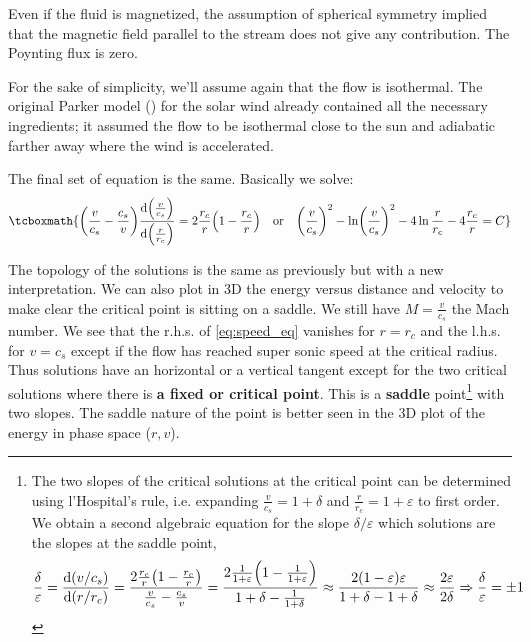 \documentclass[10pt,a4paper,english]{article}
\let\originalleft\left
\let\originalright\right
\renewcommand{\left}{\mathopen{}\mathclose\bgroup\originalleft}
\renewcommand{\right}{\aftergroup\egroup\originalright}
\begin{document}
Even if the fluid is magnetized, the assumption of spherical symmetry implied
that the magnetic field parallel to the stream does not give any contribution.
The Poynting flux is zero.

For the sake of simplicity, we'll assume again that the flow is isothermal. The
original Parker model (\cite{1958ApJ...128..664P}) for the solar wind already
contained all the necessary ingredients; it assumed the flow to be isothermal
close to the sun and adiabatic farther away where the wind is accelerated.

The final set of equation is the same. Basically we solve:
\begin{equation}
    \tcboxmath{
        \left( \frac{v}{c_s} - \frac{c_s}{v} \right) \frac{\d \left( \frac{v}{c_s} \right) }{\d \left( \frac{r}{r_c } \right) } = 2 \frac{r_c}{r} \left( 1 - \frac{r_c }{r} \right)\quad \textrm{or} \quad
        \left( \frac{v}{c_s} \right)^2 - \ln \left( \frac{v}{c_s} \right)^2 - 4\ln \frac{r}{r_c }- 4 \frac{r_c}{r} = C
    }
\end{equation}

The topology of the solutions is the same as previously but with a new
interpretation. We can also plot in 3D the energy versus distance and velocity
to make clear the critical point is sitting on a saddle. We still have $M =
\frac{v}{c_s}$ the Mach number. We see that the r.h.s. of \eqref{eq:speed_eq}
vanishes for $r=r_c$ and the l.h.s. for $v=c_s$ except if the flow has reached
super sonic speed at the critical radius. Thus solutions have an horizontal or
a vertical tangent except for the two critical solutions where there is
\textbf{a fixed or critical point}. This is a \textbf{saddle}
point\footnote{The two slopes of the critical solutions at the critical point
can be determined using l'Hospital's rule, i.e. expanding $\frac{v}{c_s} = 1 +
\delta$ and $\frac{r}{r_c} = 1 + \varepsilon$ to first order. We obtain a
second algebraic equation for the slope $\delta/\varepsilon$ which solutions
are the slopes at the saddle point,
\begin{equation*}
        \frac{\delta}{\varepsilon} = \frac{\d (v/c_s)}{\d (r/r_c)} = \frac{2 \frac{r_c }{r}\left( 1 - \frac{r_c }{r} \right) }{\frac{v}{c_s} - \frac{c_s}{v}} = \frac{2 \frac{1}{1+\varepsilon} \left( 1 - \frac{1}{1+\varepsilon} \right) }{1 + \delta - \frac{1}{1+\delta}} \approx \frac{2(1-\varepsilon)\varepsilon}{1 + \delta - 1 + \delta} \approx \frac{2\varepsilon}{2\delta} \Rightarrow \frac{\delta}{\varepsilon} = \pm 1
\end{equation*}} with two slopes. The saddle nature of the point is better seen
in the 3D plot of the energy in phase space ($r, v$).
\end{document}
